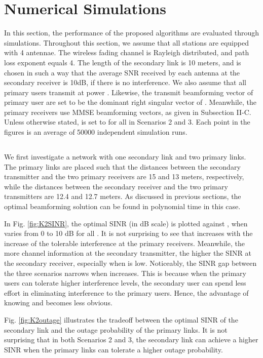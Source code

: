 \documentclass[twocolumn,10pt]{IEEEtran}
\theoremstyle{plain} \newtheorem{theorem}{Theorem}
\theoremstyle{plain} \newtheorem{proposition}{Proposition}
\theoremstyle{plain} \newtheorem{corollary}{Corollary}
\theoremstyle{remark} \newtheorem{remark}{Remark}
\theoremstyle{remark} \newtheorem{lemma}{Lemma}
\theoremstyle{plain} \newtheorem{definition}{Definition}
\theoremstyle{plain} \newtheorem{assumption}{Assumption}
\theoremstyle{plain} \newtheorem{fact}{Fact}
\begin{document}
\section{Numerical Simulations}\label{sec:simulation}
In this section, the performance of the proposed algorithms are evaluated through simulations. Throughout this section, we assume that all stations are equipped with 4 antennae. The wireless fading channel is Rayleigh distributed, and path loss exponent equals 4. The length of the secondary link is 10 meters, and  is chosen in such a way that the average SNR received by each antenna at the secondary receiver is 10dB, if there is no interference. We also assume that all primary users transmit at power . Likewise, the transmit beamforming vector  of primary user  are set to be the dominant right singular vector of  . Meanwhile, the primary receivers use MMSE beamforming vectors, as given in Subsection II-C. Unless otherwise stated,  is set to  for all  in Scenarios 2 and 3. Each point in the figures is an average of 50000 independent simulation runs.

\subsection{}

We first investigate a network with one secondary link and two primary links. The primary links are placed such that the distances between the secondary transmitter and the two primary receivers are 15 and 13 meters, respectively, while the distances between the secondary receiver and the two primary transmitters are 12.4 and 12.7 meters. As discussed in previous sections, the optimal beamforming solution  can be found in polynomial time in this case.

In Fig. \ref{fig:K2SINR}, the optimal SINR  (in dB scale) is plotted against , when  varies from 0 to 10 dB for all . It is not surprising to see that  increases with the increase of the tolerable interference  at the primary receivers. Meanwhile, the more channel information at the secondary transmitter, the higher the SINR at the secondary receiver, especially when  is low. Noticeably, the SINR gap between the three scenarios narrows when  increases. This is because when the primary users can tolerate higher interference levels, the secondary user can spend less effort in eliminating interference to the primary users. Hence, the advantage of knowing  and  becomes less obvious.

Fig. \ref{fig:K2outage} illustrates the tradeoff between the optimal SINR  of the secondary link and the outage probability  of the primary links. It is not surprising that in both Scenarios 2 and 3, the secondary link can achieve a higher SINR when the primary links can tolerate a higher outage probability.
\end{document}
